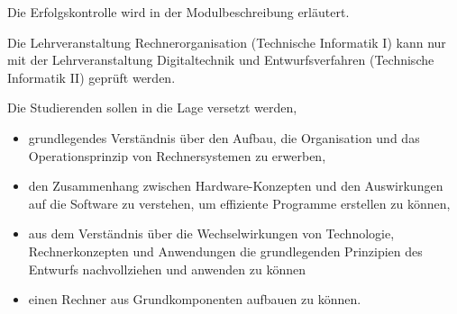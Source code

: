 \begin{course}

\setdoclanguagegerman
{}



\coursehead


\label{cour_7005.dp_997}


\begin{styleenv}
\begin{assessment}
Die Erfolgskontrolle wird in der Modulbeschreibung erläutert.


\end{assessment}

\begin{conditions}Die Lehrveranstaltung Rechnerorganisation (Technische Informatik I) kann nur mit der Lehrveranstaltung Digitaltechnik und Entwurfsverfahren (Technische Informatik II) geprüft werden.

\end{conditions}


\end{styleenv}

\begin{learningoutcomes}
Die Studierenden sollen in die Lage versetzt werden,

 \begin{itemize}\item grundlegendes Verständnis über den Aufbau, die Organisation und das Operationsprinzip von Rechnersystemen zu erwerben,  \item den Zusammenhang zwischen Hardware-Konzepten und den Auswirkungen auf die Software zu verstehen, um effiziente Programme erstellen zu können,   \item aus dem Verständnis über die Wechselwirkungen von Technologie, Rechnerkonzepten und Anwendungen die grundlegenden Prinzipien des Entwurfs nachvollziehen und anwenden zu können   \item einen Rechner aus Grundkomponenten aufbauen zu können.  \end{itemize}
\end{learningoutcomes}


\end{course}
